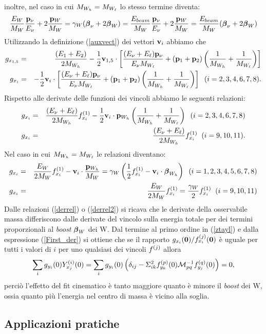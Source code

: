 inoltre, nel caso in cui $M_{W_h}=M_{W_\ell}$ lo stesso termine diventa:
\[\frac{E_W}{M_W}\frac{{\bf p}_\nu}{E_\nu}+2\frac{{\bf p}_W}{M_W}=\gamma_W(\mbox{\boldmath $\beta$}_\nu+2\mbox{\boldmath $\beta$}_W)=\frac{E_{beam}}{M_W}\frac{{\bf p}_\nu}{E_\nu}+2\frac{{\bf p}_W}{M_W}=\frac{E_{beam}}{M_W}(\mbox{\boldmath $\beta$}_\nu+2\mbox{\boldmath $\beta$}_W)\]
Utilizzando la definizione (\ref{auxvect}) dei vettori ${\bf v}_i$ abbiamo che
\begin{eqnarray*}
g_{x_{1,5}}&=&\frac{(E_1+E_2)}{2M_{W_h}}-\frac{1}{2}{\bf v}_{1,5}\cdot\left[\frac{(E_\nu+E_\ell){\bf p}_\nu}{E_\nu M_{W_\ell}}+({\bf p}_1+{\bf p}_2)\left(\frac{1}{M_{W_h}}+\frac{1}{M_{W_\ell}}\right)\right]\\
g_{x_i}&=&-\frac{1}{2}{\bf v}_i\cdot\left[\frac{(E_\nu+E_\ell){\bf p}_\nu}{E_\nu M_{W_\ell}}+({\bf p}_1+{\bf p}_2)\left(\frac{1}{M_{W_h}}+\frac{1}{M_{W_\ell}}\right)\right]\;\;(i=2,3,4,6,7,8).
\end{eqnarray*}
Rispetto alle derivate delle funzioni dei vincoli abbiamo le seguenti relazioni:
\begin{eqnarray}
\label{derrel}
g_{x_i}&=&\frac{(E_\nu+E_\ell)}{2M_{W_h}}f^{(1)}_{x_i}-\frac{1}{2}{\bf v}_i\cdot{\bf p}_{W_h}\left(\frac{1}{M_{W_h}}+\frac{1}{M_{W_\ell}}\right)\;\; (i=2,3,4,6,7,8)\nonumber\\
g_{x_i}&=&\frac{(E_\nu+E_\ell)}{2M_{W_h}}f^{(1)}_{x_i}\;\; (i=9,10,11).
\end{eqnarray}
Nel caso in cui $M_{W_h}=M_{W_\ell}$ le relazioni diventano:
\begin{eqnarray}
\label{derrel2}
g_{x_i}&=&\frac{E_W}{2M_W}f^{(1)}_{x_i}-{\bf v}_i\cdot\frac{{\bf p}_{W_h}}{M_W}=\gamma_W\left(\frac{1}{2}f^{(1)}_{x_i}-{\bf v}_i\cdot\mbox{\boldmath $\beta$}_{W_h}\right)\;\;(i=1,2,3,4,5,6,7,8)\nonumber\\
g_{x_i}&=&\frac{E_W}{2M_W}f^{(1)}_{x_i}=\frac{\gamma_W}{2}f^{(1)}_{x_i}\;\;(i=9,10,11)
\end{eqnarray}
Dalle relazioni (\ref{derrel}) o (\ref{derrel2}) si ricava che le derivate della
osservabile massa differiscono dalle derivate del vincolo sulla energia totale
per dei termini proporzionali al {\em boost} $\mbox{\boldmath $\beta$}_W$ dei W. Dal termine al primo
ordine in (\ref{ztayl}) e dalla espressione (\ref{First_der}) si ottiene che se
il rapporto $g_{x_i}({\bf 0})/f^{(j)}_{x_i}({\bf 0})$ \`e uguale per tutti i valori
di $i$ per uno qualsiasi dei vincoli $f^{(j)}$ allora\[\sum_ig_{y_i}(0)Y^{(i)}_{x_j}(0)=\sum_ig_{y_i}(0)\left(\delta_{ij}-\Sigma^2_{ik}f^{(p)}_{y_k}(0){\cal M}^{-1}_{pq}f^{(q)}_{y_j}(0)\right)=0,\]perci\`o l'effetto del fit cinematico \`e tanto maggiore quanto \`e minore il {\em boost} dei W, ossia quanto pi\`u l'energia nel centro di massa \`e vicino
alla soglia.
%
\subsection{Applicazioni pratiche}
%
